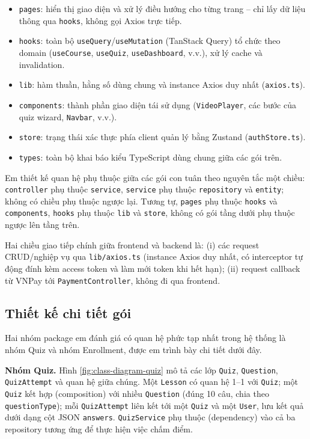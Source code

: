 \documentclass[../DoAn.tex]{subfiles}
\begin{document}
\begin{itemize}
    \item \texttt{pages}: hiển thị giao diện và xử lý điều hướng cho từng trang -- chỉ lấy dữ liệu thông qua \texttt{hooks}, không gọi Axios trực tiếp.
    \item \texttt{hooks}: toàn bộ \texttt{useQuery}/\texttt{useMutation} (TanStack Query) tổ chức theo domain (\texttt{useCourse}, \texttt{useQuiz}, \texttt{useDashboard}, v.v.), xử lý cache và invalidation.
    \item \texttt{lib}: hàm thuần, hằng số dùng chung và instance Axios duy nhất (\texttt{axios.ts}).
    \item \texttt{components}: thành phần giao diện tái sử dụng (\texttt{VideoPlayer}, các bước của quiz wizard, \texttt{Navbar}, v.v.).
    \item \texttt{store}: trạng thái xác thực phía client quản lý bằng Zustand (\texttt{authStore.ts}).
    \item \texttt{types}: toàn bộ khai báo kiểu TypeScript dùng chung giữa các gói trên.
\end{itemize}

Em thiết kế quan hệ phụ thuộc giữa các gói con tuân theo nguyên tắc một chiều: \texttt{controller} phụ thuộc \texttt{service}, \texttt{service} phụ thuộc \texttt{repository} và \texttt{entity}; không có chiều phụ thuộc ngược lại. Tương tự, \texttt{pages} phụ thuộc \texttt{hooks} và \texttt{components}, \texttt{hooks} phụ thuộc \texttt{lib} và \texttt{store}, không có gói tầng dưới phụ thuộc ngược lên tầng trên.

Hai chiều giao tiếp chính giữa frontend và backend là: (i) các request CRUD/nghiệp vụ qua \texttt{lib/axios.ts} (instance Axios duy nhất, có interceptor tự động đính kèm access token và làm mới token khi hết hạn); (ii) request callback từ VNPay tới \texttt{PaymentController}, không đi qua frontend.

\subsection{Thiết kế chi tiết gói}
\label{subsection:4.1.3}

Hai nhóm package em đánh giá có quan hệ phức tạp nhất trong hệ thống là nhóm Quiz và nhóm Enrollment, được em trình bày chi tiết dưới đây.

\textbf{Nhóm Quiz.} Hình \ref{fig:class-diagram-quiz} mô tả các lớp \texttt{Quiz}, \texttt{Question}, \texttt{QuizAttempt} và quan hệ giữa chúng. Một \texttt{Lesson} có quan hệ 1--1 với \texttt{Quiz}; một \texttt{Quiz} kết hợp (composition) với nhiều \texttt{Question} (đúng 10 câu, chia theo \texttt{questionType}); mỗi \texttt{QuizAttempt} liên kết tới một \texttt{Quiz} và một \texttt{User}, lưu kết quả dưới dạng cột JSON \texttt{answers}. \texttt{QuizService} phụ thuộc (dependency) vào cả ba repository tương ứng để thực hiện việc chấm điểm.
\end{document}

